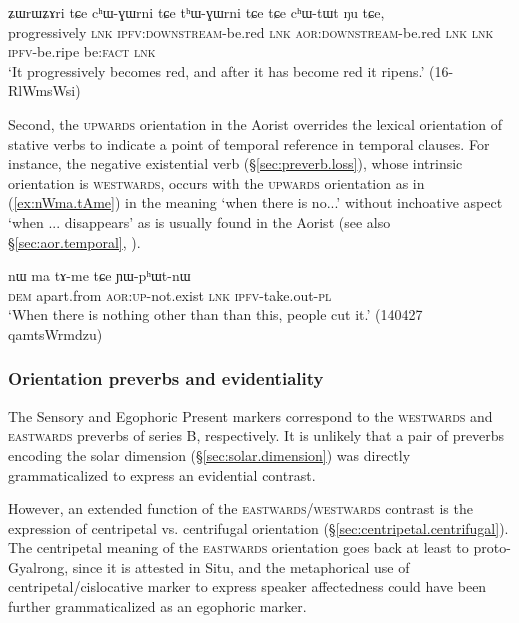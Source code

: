 \begin{exe}
\ex \label{ex:chWGWrni}
\gll ʑɯrɯʑɤri tɕe cʰɯ-ɣɯrni tɕe tʰɯ-ɣɯrni tɕe tɕe cʰɯ-tɯt ŋu tɕe,  \\
progressively \textsc{lnk} \textsc{ipfv}:\textsc{downstream}-be.red \textsc{lnk} \textsc{aor}:\textsc{downstream}-be.red \textsc{lnk} \textsc{lnk} \textsc{ipfv}-be.ripe be:\textsc{fact} \textsc{lnk}  \\
\glt `It progressively becomes red, and after it has become red it ripens.' (16-RlWmsWsi) 
\end{exe}
 
Second, the \textsc{upwards} orientation in the Aorist overrides the lexical orientation of stative verbs to indicate a point of temporal reference in temporal clauses. For instance, the negative existential verb  (§\ref{sec:preverb.loss}), whose intrinsic orientation is \textsc{westwards}, occurs with the \textsc{upwards} orientation as in (\ref{ex:nWma.tAme}) in the meaning `when there is no...' without inchoative aspect `when ... disappears' as is usually found in the Aorist (see also §\ref{sec:aor.temporal}, \citealt[283, fn 10]{jacques14linking}).

\begin{exe}
\ex \label{ex:nWma.tAme}
\gll  nɯ ma tɤ-me tɕe ɲɯ-pʰɯt-nɯ  \\
\textsc{dem} apart.from \textsc{aor}:\textsc{up}-not.exist \textsc{lnk}  \textsc{ipfv}-take.out-\textsc{pl}   \\
\glt `When there is nothing other than than this, people cut it.' (140427 qamtsWrmdzu)
\end{exe} 

\subsubsection{Orientation preverbs and evidentiality} \label{sec:orientation.preverb.evd}
The Sensory  and Egophoric Present  markers correspond to the \textsc{westwards} and \textsc{eastwards} preverbs of series B, respectively. It is unlikely that a pair of preverbs encoding the solar dimension (§\ref{sec:solar.dimension}) was directly grammaticalized to express an evidential contrast.

However, an extended function of the \textsc{eastwards}/\textsc{westwards} contrast is the expression of centripetal vs. centrifugal orientation (§\ref{sec:centripetal.centrifugal}). The centripetal meaning of the \textsc{eastwards} orientation goes back at least to proto-Gyalrong, since it is attested in Situ, and the metaphorical use of centripetal/cislocative marker to express speaker affectedness could have been further grammaticalized as an egophoric marker. 

